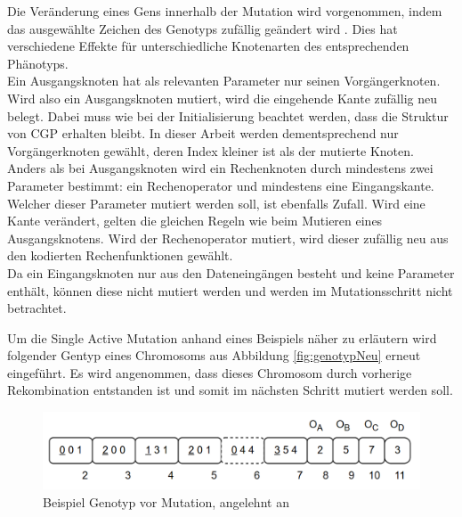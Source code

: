 Die Veränderung eines Gens innerhalb der Mutation wird vorgenommen, indem das ausgewählte Zeichen des Genotyps zufällig geändert wird \cite{koza_survey_1995}. Dies hat verschiedene Effekte für unterschiedliche Knotenarten des entsprechenden Phänotyps.\\
Ein Ausgangsknoten hat als relevanten Parameter nur seinen Vorgängerknoten.
Wird also ein Ausgangsknoten mutiert, wird die eingehende Kante zufällig neu belegt.
Dabei muss wie bei der Initialisierung beachtet werden, dass die Struktur von CGP erhalten bleibt.
In dieser Arbeit werden dementsprechend nur Vorgängerknoten gewählt, deren Index kleiner ist als der mutierte Knoten.\\
Anders als bei Ausgangsknoten wird ein Rechenknoten durch mindestens zwei Parameter bestimmt: ein Rechenoperator und mindestens eine Eingangskante.
Welcher dieser Parameter mutiert werden soll, ist ebenfalls Zufall.
Wird eine Kante verändert, gelten die gleichen Regeln wie beim Mutieren eines Ausgangsknotens.
Wird der Rechenoperator mutiert, wird dieser zufällig neu aus den kodierten Rechenfunktionen gewählt.\\
Da ein Eingangsknoten nur aus den Dateneingängen besteht und keine Parameter enthält, können diese nicht mutiert werden und werden im Mutationsschritt nicht betrachtet.

Um die Single Active Mutation anhand eines Beispiels näher zu erläutern wird folgender Gentyp eines Chromosoms aus Abbildung \ref{fig:genotypNeu} erneut eingeführt.
Es wird angenommen, dass dieses Chromosom durch vorherige Rekombination entstanden ist und somit im nächsten Schritt mutiert werden soll.

\begin{figure}[H]
	\centering
	\includegraphics[scale = 0.5]{Bilder/TorabiBeispielGenotypNeu.png}
	\caption{Beispiel Genotyp vor Mutation, angelehnt an \cite{torabi_using_2022}}
	\label{fig:genotypVorMutation}
\end{figure}

